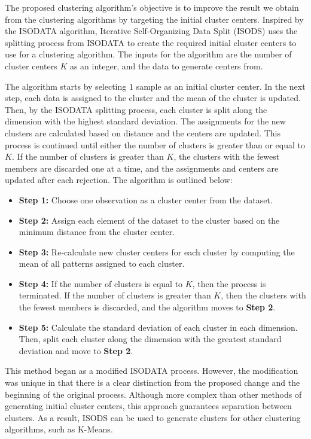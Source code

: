 \documentclass[a4paper, 10pt]{article}
\begin{document}
The proposed clustering algorithm's objective is to improve the result we obtain
from the clustering algorithms by targeting the initial cluster centers.
Inspired by the ISODATA algorithm, Iterative Self-Organizing Data Split (ISODS)
uses the splitting process from ISODATA to create the required initial cluster
centers to use for a clustering algorithm. The inputs for the algorithm are the
number of cluster centers $K$ as an integer, and the data to generate centers
from. 

The algorithm starts by selecting $1$ sample as an initial cluster center. In
the next step, each data is assigned to the cluster and the mean of the cluster
is updated. Then, by the ISODATA splitting process, each cluster is split along
the dimension with the highest standard deviation. The assignments for the new
clusters are calculated based on distance and the centers are updated. This
process is continued until either the number of clusters is greater than or
equal to $K$. If the number of clusters is greater than $K$, the clusters with
the fewest members are discarded one at a time, and the assignments and centers
are updated after each rejection. The algorithm is outlined below:

\begin{itemize}
      \item \textbf{Step 1:} Choose one observation as a cluster center from the
            dataset.
      \item \textbf{Step 2:} Assign each element of the dataset to the cluster
            based on the minimum distance from the cluster center.
      \item \textbf{Step 3:} Re-calculate new cluster centers for each cluster
            by computing the mean of all patterns assigned to each cluster.
      \item \textbf{Step 4:} If the number of clusters is equal to $K$, then the
            process is terminated. If the number of clusters is greater than
            $K$, then the clusters with the fewest members is discarded, and the
            algorithm moves to \textbf{Step 2}.
      \item \textbf{Step 5:} Calculate the standard deviation of each cluster in
            each dimension. Then, split each cluster along the dimension with
            the greatest standard deviation and move to \textbf{Step 2}.
\end{itemize}

This method began as a modified ISODATA process. However, the modification was
unique in that there is a clear distinction from the proposed change and the
beginning of the original process. Although more complex than other methods of
generating initial cluster centers, this approach guarantees separation between
clusters. As a result, ISODS can be used to generate clusters for other
clustering algorithms, such as K-Means.
\end{document}
